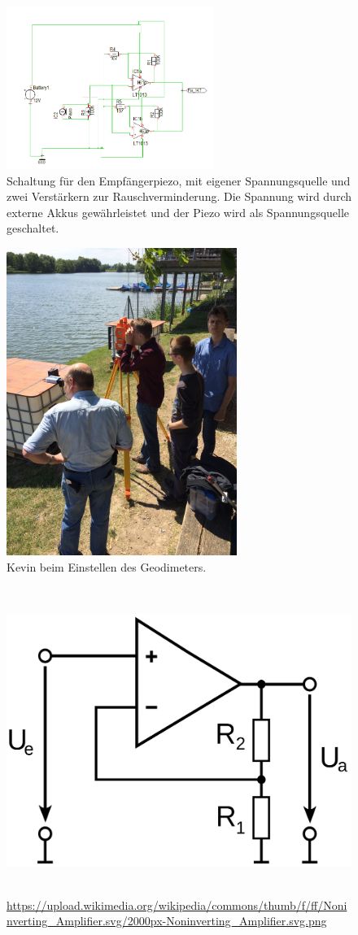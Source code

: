 \documentclass[12pt,a4paper,titlepage,headinclude,bibtotoc]{scrartcl}
\numberwithin{equation}{subsection}
\begin{document}
\begin{figure}[!h]
\centering
\includegraphics[width=0.6\textwidth]{Fotos/Echoverstaerker.png}
\caption{Schaltung für den Empfängerpiezo, mit eigener Spannungsquelle und zwei Verstärkern zur Rauschverminderung. Die Spannung wird durch externe Akkus gewährleistet und der Piezo wird als Spannungsquelle geschaltet.}
\label{fig:Echoverstaerker}
\end{figure}



\begin{figure}[h]
	\centering
	\includegraphics[height=10cm]{Fotos/Geodimeter}
	\caption{Kevin beim Einstellen des Geodimeters.}
	\label{fig:geodimeter}
\end{figure}


\begin{figure}[h]
	\centering
	\includegraphics[height=10cm]{nicht.png}
	\caption{\url{https://upload.wikimedia.org/wikipedia/commons/thumb/f/ff/Noninverting_Amplifier.svg/2000px-Noninverting_Amplifier.svg.png}}
	\label{fig:nicht}
\end{figure}
\end{document}
